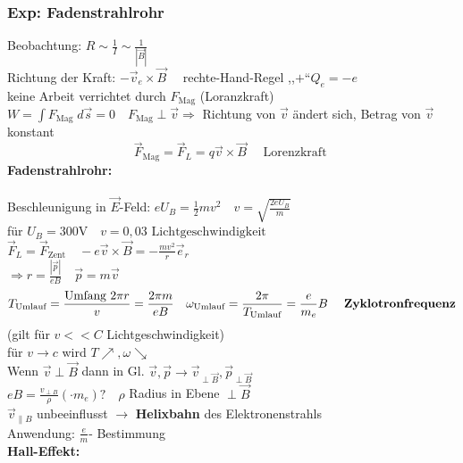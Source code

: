 \documentclass[titlepage,12pt,a4paper,ngerman]{report}
\newcommand{\tx}[1]{\textrm{#1}}
\begin{document}
\subsubsection{Exp: Fadenstrahlrohr}
Beobachtung: $  R \sim \frac{1}{I} \sim \frac{1}{|\vec{B}|} $\\
Richtung der Kraft: $ -\vec{v}_e \times \vec{B} \quad $ rechte-Hand-Regel ,,$ + $``$ Q_e = -e $\\[10pt]
keine Arbeit verrichtet durch $ F_{\tx{Mag}}  $ (Loranzkraft) $ W = \int F_{\tx{Mag}} \; d\vec{s} = 0\quad F_{\tx{Mag}} \perp \vec{v} \Rightarrow $ Richtung von $ \vec{v} $ ändert sich, Betrag von $ \vec{v} $ konstant
$$\boxed{\vec{F}_{\tx{Mag}} = \vec{F}_L = q \vec{v} \times \vec{B}} \quad \tx{ Lorenzkraft }$$
\textbf{Fadenstrahlrohr:}\\
\\Beschleunigung in $ \vec{E} $-Feld: $ eU_B = \frac{1}{2} m v^2 \quad v = \sqrt{\frac{2 e U _B}{m}} $\\
für $ U_B = 300 \tx{V} \quad v = 0,03 \tx{ Lichtgeschwindigkeit } $\\
$ \vec{F}_L  = \vec{F} _{\tx{Zent}} \quad -e \vec{v} \times \vec{B} = - \frac{mv^2}{r} \vec{e}_r$\\
$ \Rightarrow r = \frac{|\vec{p}|}{e B } \quad \vec{p} = m \vec{v} $\\
$$ T_{\tx{Umlauf}} = \frac{\tx{Umfang } 2 \pi r }{v} = \frac{ 2\pi m}{e B} \quad \omega _{\tx{Umlauf}} = \frac{2\pi }{T _{\tx{Umlauf}}} = \frac{e}{m_e} B \quad \tx{ \textbf{Zyklotronfrequenz}} $$
(gilt für $  v<<C $ Lichtgeschwindigkeit)\\
für $ v \rightarrow c $ wird $ T \nearrow , \omega \searrow $\\[5pt]
Wenn $ \vec{v} \perp \vec{B} $  dann in Gl. $ \vec{v},\vec{p} \rightarrow \vec{v}_{\perp \vec{B}}, \vec{p}_{\perp \vec{B}} $\\
$ eB = \frac{v_{\perp B}}{\rho} (\cdot m_e)? \quad \rho $ Radius in Ebene $ \perp \vec{B} $\\
$ \vec{v}_{\parallel B} $ unbeeinflusst $ \rightarrow $ \textbf{Helixbahn} des Elektronenstrahls\\
Anwendung: $ \frac{e}{m} $- Bestimmung\\[10pt]
\textbf{Hall-Effekt:}
\end{document}
